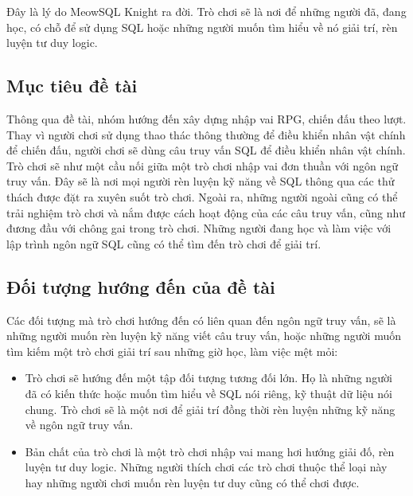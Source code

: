\hspace*{1cm} Đây là lý do MeowSQL Knight ra đời. Trò chơi sẽ là nơi để những người đã, đang học, có chỗ để sử dụng SQL hoặc những người muốn tìm hiểu về nó giải trí, rèn luyện tư duy logic.
\subsection{Mục tiêu đề tài}
Thông qua đề tài, nhóm hướng đến xây dựng nhập vai RPG, chiến đấu theo lượt. Thay vì người chơi sử dụng thao thác thông thường để điều khiển nhân vật chính để chiến đấu, người chơi sẽ dùng câu truy vấn SQL để điều khiển nhân vật chính.\\
Trò chơi sẽ như một cầu nối giữa một trò chơi nhập vai đơn thuần với ngôn ngữ truy vấn.
Đây sẽ là nơi mọi người rèn luyện kỹ năng về SQL thông qua các thử thách được đặt ra xuyên suốt trò chơi. Ngoài ra, những người ngoài cũng có thể trải nghiệm trò chơi và nắm được cách hoạt động của các câu truy vấn, cũng như đương đầu với chông gai trong trò chơi. Những người đang học và làm việc với lập trình ngôn ngữ SQL cũng có thể tìm đến trò chơi để giải trí.
\subsection{Đối tượng hướng đến của đề tài}


\hspace*{1cm} Các đối tượng mà trò chơi hướng đến có liên quan đến ngôn ngữ truy vấn, sẽ là những người muốn rèn luyện kỹ năng viết câu truy vấn, hoặc những người muốn tìm kiếm một trò chơi giải trí sau những giờ học, làm việc mệt mỏi:
\begin{itemize}
	\item Trò chơi sẽ hướng đến một tập đối tượng tương đối lớn. Họ là những người đã có kiến thức hoặc muốn tìm hiểu về SQL nói riêng, kỹ thuật dữ liệu nói chung. Trò chơi sẽ là một nơi để giải trí đồng thời rèn luyện những kỹ năng về ngôn ngữ truy vấn.
	\item Bản chất của trò chơi là một trò chơi nhập vai mang hơi hướng giải đố, rèn luyện tư duy logic. Những người thích chơi các trò chơi thuộc thể loại này hay những người chơi muốn rèn luyện tư duy cũng có thể chơi được.
\end{itemize}
